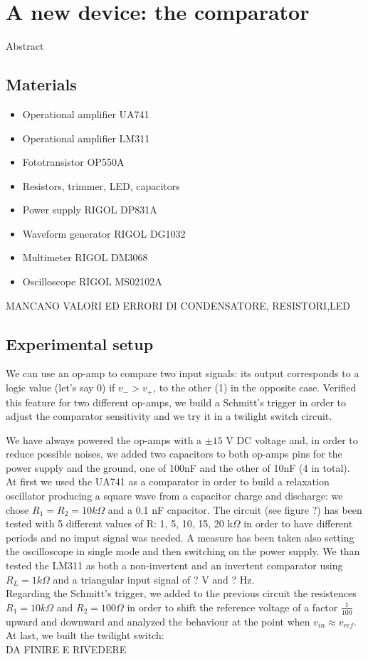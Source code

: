
\chapter{A new device: the comparator}
Abstract


\section{Materials}
\begin{itemize}
\item Operational amplifier UA741
\item Operational amplifier LM311
\item Fototransistor OP550A
\item Resistors, trimmer, LED, capacitors
\item Power supply RIGOL DP831A
\item Waveform generator RIGOL DG1032
\item Multimeter RIGOL DM3068
\item Oscilloscope RIGOL MS02102A
\end{itemize}
MANCANO VALORI ED ERRORI DI CONDENSATORE, RESISTORI,LED

\section{Experimental setup}

We can use an op-amp to compare two input signals: its output corresponds to a logic value (let's say 0) if $v_- > v_+$, to the other (1) in the opposite case. Verified this feature for two different op-amps, we build a Schmitt's trigger in order to adjust the comparator sensitivity and we try it in a twilight switch circuit.

We have always powered the op-amps with a $\pm15$ V DC voltage and, in order to reduce possible noises, we added two capacitors to both op-amps pins for the power supply and the ground, one of 100nF and the other of 10nF (4 in total).\\
At first we used the UA741 as a comparator in order to build a relaxation oscillator producing a square wave from a capacitor charge and discharge: we chose $R_1 = R_2 = 10k\Omega$ and a 0.1 nF capacitor. The circuit (see figure ?) has been tested with 5 different values of R: 1, 5, 10, 15, 20 k$\Omega$ in order to have different periods and no imput signal was needed. A measure has been taken also setting the oscilloscope in single mode and then switching on the power supply.
We than tested the LM311 as both a non-invertent and an invertent comparator using $R_L = 1k\Omega$ and a triangular input signal of ? V and ? Hz.\\
Regarding the Schmitt's trigger, we added to the previous circuit the resistences $R_1 = 10 k\Omega$ and $R_2 = 100 \Omega$ in order to shift the reference voltage of a factor $\frac{1}{100}$ upward and downward and analyzed the behaviour at the point when $v_{in}\approx v_{ref}$.\\
At last, we built the twilight switch:\\
DA FINIRE E RIVEDERE


